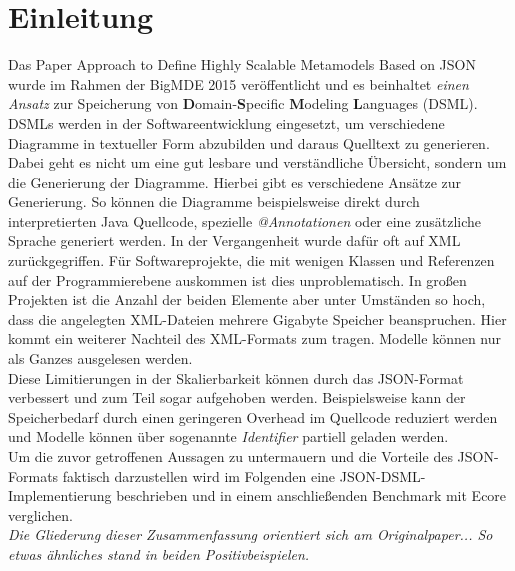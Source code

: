 \section{Einleitung}
Das Paper Approach to Define Highly Scalable Metamodels Based on JSON \cite{gerhart2015approach} wurde im Rahmen der BigMDE 2015 veröffentlicht und es beinhaltet \textit{einen Ansatz} zur Speicherung von \textbf{D}omain-\textbf{S}pecific \textbf{M}odeling \textbf{L}anguages (DSML). DSMLs werden in der Softwareentwicklung eingesetzt, um verschiedene Diagramme in textueller Form abzubilden und daraus Quelltext zu generieren. Dabei geht es nicht um eine gut lesbare und verständliche Übersicht, sondern um die Generierung der Diagramme. Hierbei gibt es verschiedene Ansätze zur Generierung. So können die Diagramme beispielsweise direkt durch interpretierten Java Quellcode, spezielle \textit{@Annotationen} oder eine zusätzliche Sprache generiert werden\cite{france2005domain}. In der Vergangenheit wurde dafür oft auf XML zurückgegriffen. Für Softwareprojekte, die mit wenigen Klassen und Referenzen auf der Programmierebene auskommen ist dies unproblematisch. In großen Projekten ist die Anzahl der beiden Elemente aber unter Umständen so hoch, dass die angelegten XML-Dateien mehrere Gigabyte Speicher beanspruchen. Hier kommt ein weiterer Nachteil des XML-Formats zum tragen. Modelle können nur als Ganzes ausgelesen werden. \\
Diese Limitierungen in der Skalierbarkeit können durch das JSON-Format verbessert und zum Teil sogar aufgehoben werden. Beispielsweise kann der Speicherbedarf durch einen geringeren Overhead im Quellcode reduziert werden und Modelle können über sogenannte \textit{Identifier} partiell geladen werden. \\
Um die zuvor getroffenen Aussagen zu untermauern und die Vorteile des JSON-Formats faktisch darzustellen wird im Folgenden eine JSON-DSML-Implementierung beschrieben und in einem anschließenden Benchmark mit Ecore verglichen. \\
\textit{Die Gliederung dieser Zusammenfassung orientiert sich am Originalpaper... \glqq So etwas ähnliches stand in beiden Positivbeispielen.\grqq} 

